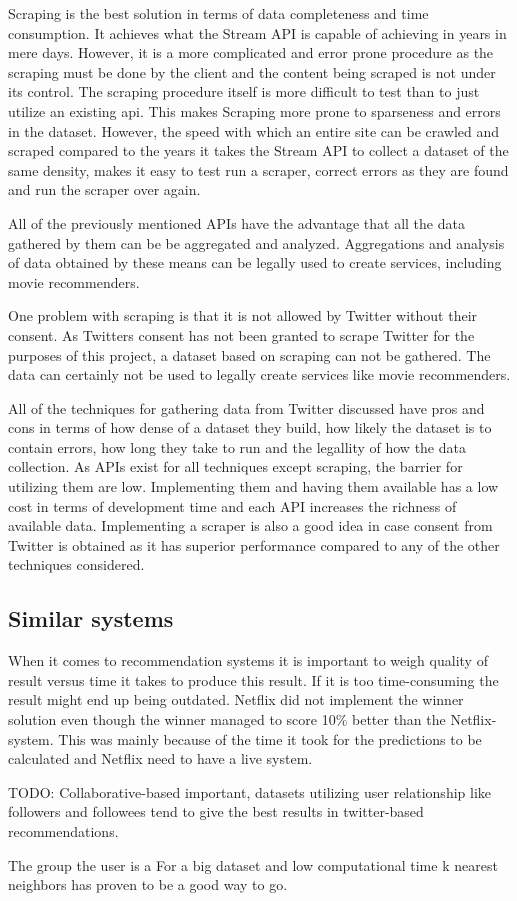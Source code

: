 Scraping is the best solution in terms of data completeness and time consumption. It achieves what the Stream API is capable of achieving in years in mere days. However, it is a more complicated and error prone procedure as the scraping must be done by the client and the content being scraped is not under its control. The scraping procedure itself is more difficult to test than to just utilize an existing api. This makes Scraping more prone to sparseness and errors in the dataset. However, the speed with which an entire site can be crawled and scraped compared to the years it takes the Stream API to collect a dataset of the same density, makes it easy to test run a scraper, correct errors as they are found and run the scraper over again.

All of the previously mentioned APIs have the advantage that all the data gathered by them can be be aggregated and analyzed. Aggregations and analysis of data obtained by these means can be legally used to create services, including movie recommenders.

One problem with scraping is that it is not allowed by Twitter without their consent. As Twitters consent has not been granted to scrape Twitter for the purposes of this project, a dataset based on scraping can not be gathered. The data can certainly not be used to legally create services like movie recommenders.

All of the techniques for gathering data from Twitter discussed have pros and cons in terms of how dense of a dataset they build, how likely the dataset is to contain errors, how long they take to run and the legallity of how the data collection. As APIs exist for all techniques except scraping, the barrier for utilizing them are low. Implementing them and having them available has a low cost in terms of development time and each API increases the richness of available data. Implementing a scraper is also a good idea in case consent from Twitter is obtained as it has superior performance compared to any of the other techniques considered.

\subsection{Similar systems}
When it comes to recommendation systems it is important to weigh quality of result versus time it takes to produce this result. If it is too time-consuming the result might end up being outdated. Netflix did not implement the winner solution even though the winner managed to score 10\% better than the Netflix-system. This was mainly because of the time it took for the predictions to be calculated and Netflix need to have a live system.

TODO: Collaborative-based important, datasets utilizing user relationship like followers and followees tend to give the best results in twitter-based recommendations.

The group the user is a
For a big dataset and low computational time k nearest neighbors has proven to be a good way to go.
